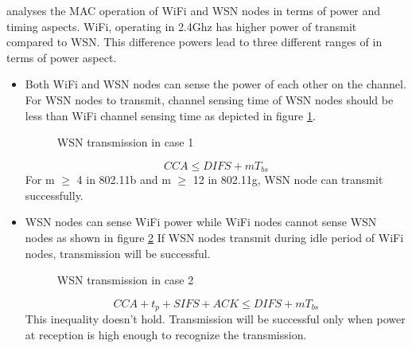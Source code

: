 \documentclass[a4paper]{article}
\begin{document}
\cite{4436237} analyses the {MAC} operation of {WiFi} and {WSN} nodes in terms of power and timing aspects. {WiFi}, operating in {2.4Ghz} has higher power of transmit compared to {WSN}. This difference powers lead to three different ranges of in terms of power aspect.
\begin{itemize}
\item Both {WiFi} and {WSN} nodes can sense the power of each other on the channel.
	For {WSN} nodes to transmit, channel sensing time of {WSN} nodes should be less than {WiFi} channel sensing time as depicted in figure \ref{wsn1}.
\begin{figure}
\caption{WSN transmission in case 1}
\label{wsn1}
\end{figure}
\begin{equation}
					CCA \leq DIFS + mT_{bs}
\end{equation}
For m $\geq$ 4 in 802.11b and m $\geq$ 12 in 802.11g, {WSN} node can transmit successfully.

\item {WSN} nodes can sense {WiFi} power while {WiFi} nodes cannot sense {WSN} nodes as shown in figure \ref{wsn2}
If {WSN} nodes transmit during idle period of {WiFi} nodes, transmission will be successful.
\begin{figure}
\caption{WSN transmission in case 2}
\label{wsn2}
\end{figure}
\begin{equation}
					CCA + t_p + SIFS + ACK \leq DIFS + mT_{bs}
\end{equation}
This inequality doesn't hold. Transmission will be successful only when power at reception is high enough to recognize the transmission.


\end{itemize}
\end{document}
